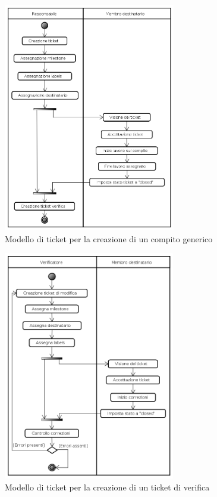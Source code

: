 \begin{figure}[h!]
	\centering
	\includegraphics[height=10cm]{./content/Immagini/Creazione_Compito.png}
	\caption{Modello di ticket per la creazione di un compito generico}
	\label{creazione_ticketstd}
\end{figure}
\pagebreak
\begin{figure}[h!]
	\centering
	\includegraphics[height=10cm]{./content/Immagini/Ticket_Verificato.png}
	\caption{Modello di ticket per la creazione di un ticket di verifica}
	\label{creazione_ticketver}
\end{figure}
\pagebreak
